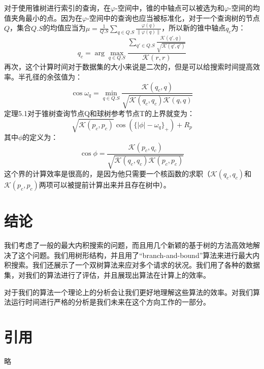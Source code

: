 \documentclass[twocolumn,a4paper]{article}
\begin{document}
对于使用锥树进行索引的查询，在$\varphi$-空间中，锥的中轴点可以被选为和$\varphi$-空间的均值夹角最小的点。因为在$\varphi$-空间中的查询也应当被标准化，对于一个查询树的节点$Q$，集合$Q.S$的均值应当为$\mu=\frac{1}{Q.S}\sum_{q \in Q.S}\frac{\varphi(q)}{\|\varphi(q)\|}$，所以新的锥中轴点$q_c$为：
\begin{equation}
q_c = \arg \max_{q\in Q.S}\frac{\sum_{q'\in Q.S}\frac{\mathcal{K}(q',q)}{\sqrt{\mathcal{K}(q',q')}}}{\mathcal{K}(r,r)}
\end{equation}
再次，这个计算时间对于数据集的大小来说是二次的，但是可以给搜索时间提高效率。半孔径的余弦值为：
\begin{equation}
\cos\omega_q = \min_{q \in Q.S}\frac{\mathcal{K}(q_c, q)}{\sqrt{\mathcal{K}(q_c, q_c)\mathcal{K}(q,q)}}
\end{equation}
定理5.1对于锥树查询节点Q和球树参考节点T的上界就变为：
\begin{equation}
\sqrt{\mathcal{K}(p_c, p_c)}\cos(\{|\phi| - \omega_q\}_+) + R_p
\end{equation}
其中$\phi$的定义为：
\begin{equation*}
\cos\phi = \frac{\mathcal{K}(p_c, q_c)}{\sqrt{\mathcal{K}(q_c, q_c)\mathcal{K}(p_c,p_c)}}
\end{equation*}
这个界的计算效率是很高的，是因为他只需要一个核函数的求职（$\mathcal{K}(q_c, q_c)$和$\mathcal{K}(p_c,p_c)$两项可以被提前计算出来并且存在树中）。

\section{结论}

我们考虑了一般的最大内积搜索的问题，而且用几个新颖的基于树的方法高效地解决了这个问题。我们用树形结构，并且用了“branch-and-bound”算法来进行最大内积搜索。我们还展示了一个双树算法来应对多个请求的状况。我们用了各种的数据集，对我们的算法进行了评估，并且展现出算法在计算上的效率。

对于我们的算法一个理论上的分析会让我们更好地理解这些算法的效率。对我们算法运行时间进行严格的分析是我们未来在这个方向工作的一部分。

\section{引用}

略
\end{document}
